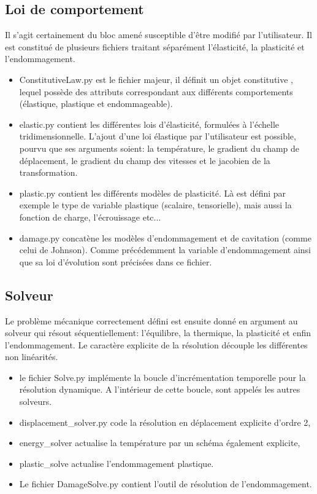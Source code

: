 \documentclass[10pt]{book}
\begin{document}
\subsection{Loi de comportement}\label{Subsection:Charon Loi de comportement}
Il s'agit certainement du bloc amené susceptible d'être modifié par l'utilisateur. Il est constitué de plusieurs fichiers traitant séparément l'élasticité, la plasticité et l'endommagement.
\begin{itemize}
\item ConstitutiveLaw.py est le fichier majeur, il définit un objet \og constitutive \fg{}, lequel possède des attributs correspondant aux différents comportements (élastique, plastique et endommageable).
\item elastic.py contient les différentes lois d'élasticité, formulées à l'échelle tridimensionnelle. L'ajout d'une loi élastique par l'utilisateur est possible, pourvu que ses arguments soient: la température, le gradient du champ de déplacement, le gradient du champ des vitesses et le jacobien de la transformation.
\item plastic.py contient les différents modèles de plasticité. Là est défini par exemple le type de variable plastique (scalaire, tensorielle), mais aussi la fonction de charge, l'écrouissage etc...
\item damage.py concatène les modèles d'endommagement et de cavitation (comme celui de Johnson). Comme précédemment la variable d'endommagement ainsi que sa loi d'évolution sont précisées dans ce fichier.
\end{itemize}
\subsection{Solveur}\label{Subsection:Charon Solveur}
Le problème mécanique correctement défini est ensuite donné en argument au solveur qui résout séquentiellement: l'équilibre, la thermique, la plasticité et enfin l'endommagement. Le caractère explicite de la résolution découple les différentes non linéarités.
\begin{itemize}
\item le fichier Solve.py implémente la boucle d'incrémentation temporelle pour la résolution dynamique. A l'intérieur de cette boucle, sont appelés les autres solveurs.
\item displacement\_solver.py code la résolution en déplacement explicite d'ordre 2,
\item energy\_solver actualise la température par un schéma également explicite,
\item plastic\_solve actualise l'endommagement plastique.
\item Le fichier DamageSolve.py contient l'outil de résolution de l'endommagement. 
\end{itemize}
\end{document}
